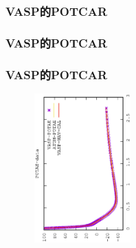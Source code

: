 {\frame
{
	\frametitle{\rm{VASP}的\rm{POTCAR}}
\centering
\vspace{-0.15in}
\fontsize{4.8pt}{4.2pt}\selectfont{
}
}

\frame
{
	\frametitle{\rm{VASP}的\rm{POTCAR}}
\begin{minipage}{0.58\textwidth}
\centering
\vspace{-0.10in}
\fontsize{3.3pt}{1.9pt}\selectfont{
}
\end{minipage}
\hfill
\begin{minipage}{0.40\textwidth}
{\fontsize{8.2pt}{6.2pt}}
\end{minipage}
}

\frame
{
	\frametitle{\rm{VASP}的\rm{POTCAR}}
\begin{minipage}{0.58\textwidth}
\centering
\vspace{-0.10in}
\fontsize{3.3pt}{1.9pt}\selectfont{
}
\end{minipage}
\hfill
\begin{minipage}{0.40\textwidth}
\begin{figure}[t!]
\centering
\vspace{-0.05in}
\includegraphics[height=2.25in,width=1.5in,viewport=0 0 350 550, angle=-90, clip]{Figures/POTAE-data.eps}
\label{Potential_Function}
\end{figure}
\end{minipage}
}

}
